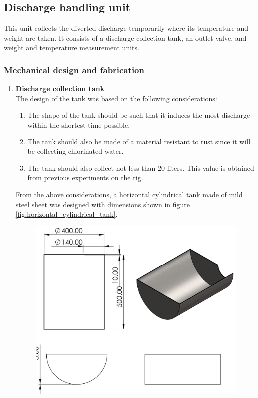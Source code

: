 \subsection{Discharge handling unit}

This unit collects the diverted discharge temporarily where its temperature and weight are taken. It consists of a discharge collection tank, an outlet valve, and weight and temperature measurement units.

\subsubsection{Mechanical design and fabrication}
\begin{enumerate}
    \item \textbf{Discharge collection tank}\\
        The design of the tank was based on the following considerations:
        \begin{enumerate}
            \item The shape of the tank should be such that it induces the most discharge within the shortest time possible.
            \item The tank should also be made of a material resistant to rust since it will be collecting chlorinated water.
            \item The tank should also collect not less than 20 liters. This value is obtained from previous experiments on the rig.
        \end{enumerate}
        From the above considerations, a horizontal cylindrical tank made of mild steel sheet was designed with dimensions shown in figure \ref{fig:horizontal_cylindrical_tank}. 
        \begin{figure}[H]
        \centering
        \includegraphics{Figures/tank.PNG}

\end{figure}
\end{enumerate}
